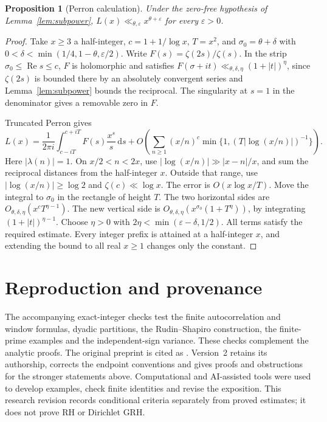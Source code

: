 \documentclass[11pt]{amsart}
\newtheorem{proposition}[theorem]{Proposition}
\theoremstyle{definition}
\theoremstyle{remark}
\newcommand{\R}{\operatorname{Re}}
\newcommand{\dd}{\,\mathrm d}
\numberwithin{equation}{section}
\begin{document}
\begin{proposition}[Perron calculation]\label{prop:perron}
Under the zero-free hypothesis of Lemma~\ref{lem:subpower}, \(L(x)\ll_{\theta,\varepsilon}x^{\theta+\varepsilon}\) for every \(\varepsilon>0\).
\end{proposition}
\begin{proof}
Take \(x\ge3\) a half-integer, \(c=1+1/\log x\), \(T=x^2\), and \(\sigma_0=\theta+\delta\) with \(0<\delta<\min(1/4,1-\theta,\varepsilon/2)\). Write \(F(s)=\zeta(2s)/\zeta(s)\). In the strip \(\sigma_0\le\R s\le c\), \(F\) is holomorphic and satisfies \(F(\sigma+it)\ll_{\theta,\delta,\eta}(1+|t|)^\eta\), since \(\zeta(2s)\) is bounded there by an absolutely convergent series and Lemma~\ref{lem:subpower} bounds the reciprocal. The singularity at \(s=1\) in the denominator gives a removable zero in \(F\).

Truncated Perron gives
\[
 L(x)=\frac{1}{2\pi i}\int_{c-iT}^{c+iT}F(s)\frac{x^s}{s}\dd s
 +O\!\left(\sum_{n\ge1}(x/n)^c
       \min\{1,(T|\log(x/n)|)^{-1}\}\right).
\]
Here \(|\lambda(n)|=1\). On \(x/2<n<2x\), use \(|\log(x/n)|\gg |x-n|/x\), and sum the reciprocal distances from the half-integer \(x\). Outside that range, use \(|\log(x/n)|\ge\log2\) and \(\zeta(c)\ll\log x\). The error is \(O(x\log x/T)\). Move the integral to \(\sigma_0\) in the rectangle of height \(T\). The two horizontal sides are \(O_{\theta,\delta,\eta}(x^c T^{\eta-1})\). The new vertical side is \(O_{\theta,\delta,\eta}(x^{\sigma_0}(1+T^\eta))\), by integrating \((1+|t|)^{\eta-1}\). Choose \(\eta>0\) with \(2\eta<\min(\varepsilon-\delta,1/2)\). All terms satisfy the required estimate. Every integer prefix is attained at a half-integer \(x\), and extending the bound to all real \(x\ge1\) changes only the constant.
\end{proof}











\section{Reproduction and provenance}

The accompanying exact-integer checks test the finite autocorrelation and window formulas, dyadic partitions, the Rudin--Shapiro construction, the finite-prime examples and the independent-sign variance. These checks complement the analytic proofs. The original preprint is cited as \cite{v1}. Version~2 retains its authorship, corrects the endpoint conventions and gives proofs and obstructions for the stronger statements above. Computational and AI-assisted tools were used to develop examples, check finite identities and revise the exposition. This research revision records conditional criteria separately from proved estimates; it does not prove RH or Dirichlet GRH.
\end{document}

